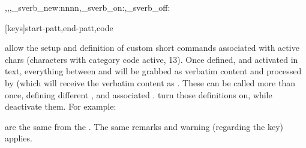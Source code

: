 \documentclass[10pt]{article}
\begin{document}
\begin{codedescribe}{\cvSVerbNew,\cvSVerbOn,\cvSVerbOff,\codeverb_sverb_new:nnnn,\codeverb_sverb_on:,\codeverb_sverb_off:}
\begin{codesyntax}%
\tsmacro{\cvSVerbNew}[keys]{start-patt,end-patt,code}
\tsmacro{\cvSVerbOn}{}
\tsmacro{\cvSVerbOff}{}
\end{codesyntax}
 allow the setup and definition of custom short commands associated with active chars (characters with category code active, 13). Once defined, and activated in text, everything between  and  will be grabbed as verbatim content and processed by  (which will receive the verbatim content as . These can be called more than once, defining different , and associated .  turn those definitions on, while  deactivate them. For example:
\end{codedescribe}

\cvSVerbOff
{}


\begin{tsremark}
   are the same from the . The same remarks and warning (regarding the  key) applies.
\end{tsremark}
\end{document}
